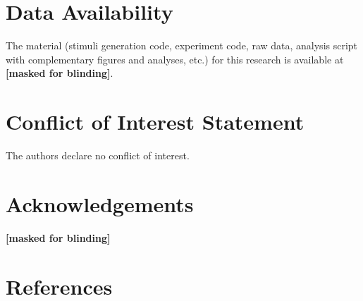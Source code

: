 \documentclass[
  man,mask,floatsintext]{apa6}
\begin{document}
\section{Data Availability}\label{data-availability}

The material (stimuli generation code, experiment code, raw data, analysis script with complementary figures and analyses, etc.) for this research is available at
\textbf{{[}masked for blinding{]}}.

\section{Conflict of Interest Statement}\label{conflict-of-interest-statement}

The authors declare no conflict of interest.

\section{Acknowledgements}\label{acknowledgements}

\textbf{{[}masked for blinding{]}}

\newpage

\section{References}\label{references}

\begingroup
\setlength{\parindent}{-0.5in}
\setlength{\leftskip}{0.5in}
\end{document}
